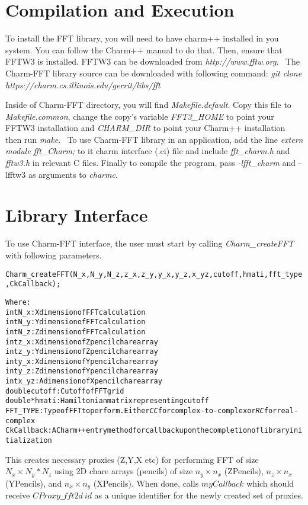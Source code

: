 \section{Compilation and Execution}
To install the FFT library, you will need to have charm++ installed in
you system. You can follow the Charm++ manual to do that. Then, ensure
that FFTW3 is installed.
FFTW3 can be downloaded from \textit{http://www.fftw.org}.
\
The Charm-FFT library source can be downloaded with following command:
\textit{git clone https://charm.cs.illinois.edu/gerrit/libs/fft}

\noindent Inside of Charm-FFT directory, you will find \textit{Makefile.default}. Copy
this file to \textit{Makefile.common}, change the copy's variable
\textit{FFT3\_HOME} to point your FFTW3 installation and \textit{CHARM\_DIR}
to point your Charm++ installation then run \textit{make}.
\
To use Charm-FFT library in an application, add the line
\textit{extern module fft\_Charm;} to it charm interface (.ci) file and include
\textit{fft\_charm.h} and \textit{fftw3.h} in relevant C files. Finally to
compile the program, pass \textit{-lfft\_charm} and {-lfftw3} as arguments to
\textit{charmc}.

\section{Library Interface}
To use Charm-FFT interface, the user must start by calling
\textit{Charm\_createFFT} with following parameters.

\begin{alltt}
    Charm\_createFFT(N\_x, N\_y, N\_z, z\_x, z\_y, y\_x, y\_z, x\_yz, cutoff, hmati, fft\_type, CkCallback);

    Where:
    int N\_x : X dimension of FFT calculation
    int N\_y : Y dimension of FFT calculation
    int N\_z : Z dimension of FFT calculation
    int z\_x : X dimension of Z pencil chare array
    int z\_y : Y dimension of Z pencil chare array
    int y\_x : X dimension of Y pencil chare array
    int y\_z : Z dimension of Y pencil chare array
    int x\_yz: A dimension of X pencil chare array
    double cutoff: Cutoff of FFT grid
    double *hmati: Hamiltonian matrix representing cutoff
    FFT\_TYPE: Type of FFT to perform. Either \textit{CC} for complex-to-complex or \textit{RC} for real-complex
    CkCallback: A Charm++ entry method for callback upon the completion of library initialization
\end{alltt}

This creates necessary proxies (Z,Y,X etc) for performing FFT of size $N_x \times N_y * N_z$ using 2D chare
arrays (pencils) of size $n_y \times n_x$ (ZPencils), $n_z \times n_x$ (YPencils), and $n_x \times n_y$ (XPencils).
When done, calls $myCallback$ which should receive $CProxy\_fft2d\ id$ as a unique identifier for the
newly created set of proxies.

